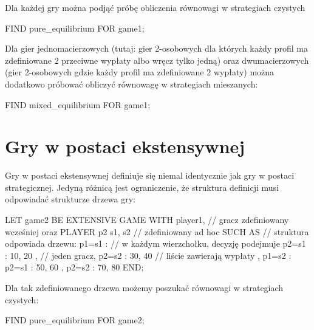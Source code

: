\documentclass[polish]{standalone}
\begin{document}
Dla każdej gry można podjąć próbę obliczenia równowagi w strategiach czystych

\begin{gtl}
FIND pure_equilibrium FOR game1;
\end{gtl}

Dla gier jednomacierzowych (tutaj: gier 2-osobowych dla których każdy profil ma zdefiniowane 2 przeciwne wypłaty albo
wręcz tylko jedną) oraz dwumacierzowych (gier 2-osobowych gdzie każdy profil ma zdefiniowane 2 wypłaty) można dodatkowo
próbować obliczyć równowagę w strategiach mieszanych:

\begin{gtl}
FIND mixed_equilibrium FOR game1;
\end{gtl}

\section{Gry w postaci ekstensywnej}

Gry w postaci ekstensywnej definiuje się niemal identycznie jak gry w postaci strategicznej. Jedyną różnicą jest
ograniczenie, że struktura definicji musi odpowiadać strukturze drzewa gry:

\begin{gtl}
LET game2 BE
  EXTENSIVE GAME
  WITH
    player1, // gracz zdefiniowany wcześniej oraz
    PLAYER p2 { s1, s2 } // zdefiniowany ad hoc
  SUCH AS      // struktura odpowiada drzewu:
    { p1=s1 :  // w każdym wierzchołku, decyzję podejmuje
      { p2=s1 : 10, 20 }, // jeden gracz,
      { p2=s2 : 30, 40 }  // liście zawierają wypłaty
    },
    { p1=s2 :
      { p2=s1 : 50, 60 },
      { p2=s2 : 70, 80 }
    }
  END;
\end{gtl}

Dla tak zdefiniowanego drzewa możemy poszukać równowagi w strategiach czystych:

\begin{gtl}
FIND pure_equilibrium FOR game2;
\end{gtl}
\end{document}
